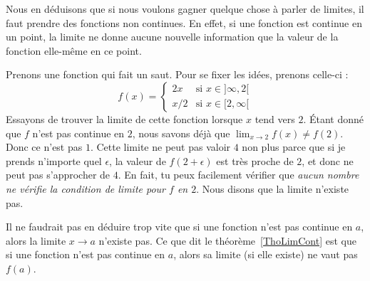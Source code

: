 Nous en déduisons que si nous voulons gagner quelque chose à parler de limites, il faut prendre des fonctions non continues. En effet, si une fonction est continue en un point, la limite ne donne aucune nouvelle information que la valeur de la fonction elle-même en ce point.

Prenons une fonction qui fait un saut. Pour se fixer les idées, prenons celle-ci :
\begin{equation}    \label{EqnCtOEL}
	f(x)=
	\begin{cases}
		2x  & \text{si }x\in]\infty,2[ \\
		x/2 & \text{si }x\in[2,\infty[
	\end{cases}
\end{equation}
Essayons de trouver la limite de cette fonction lorsque $x$ tend vers $2$. Étant donné que $f$ n'est pas continue en $2$, nous savons déjà que $\lim_{x\to 2}f(x)\neq f(2)$. Donc ce n'est pas $1$. Cette limite ne peut pas valoir $4$ non plus parce que si je prends n'importe quel $\epsilon$, la valeur de $f(2+\epsilon)$ est très proche de $2$, et donc ne peut pas s'approcher de $4$. En fait, tu peux facilement vérifier que \emph{aucun nombre ne vérifie la condition de limite pour $f$ en $2$}. Nous disons que la limite n'existe pas.

Il ne faudrait pas en déduire trop vite que si une fonction n'est pas continue en \( a\), alors la limite \( x\to a\) n'existe pas. Ce que dit le théorème~\ref{ThoLimCont} est que si une fonction n'est pas continue en \( a\), alors sa limite (si elle existe) ne vaut pas \( f(a)\).

